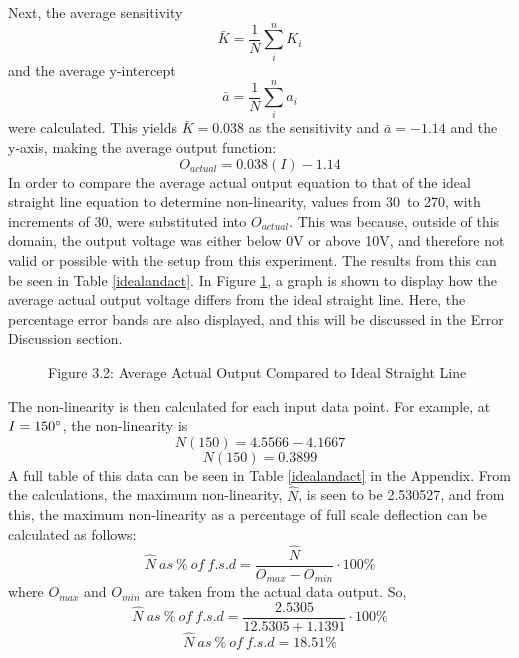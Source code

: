 \documentclass[a4,11pt]{article}
\begin{document}
Next, the average sensitivity
$$\bar{K}= \frac{1}{N}\sum_{i}^{n}{K_i}$$
and the average y-intercept
$$\bar{a}= \frac{1}{N}\sum_{i}^{n}{a_i}$$
were calculated. This yields $\bar{K}=0.038$ as the sensitivity and $\bar{a}=-1.14$ and the y-axis, making the average output function:
$$O_{actual}=0.038(I)-1.14$$
In order to compare the average actual output equation to that of the ideal straight line equation to determine non-linearity, values from 30\degree\ to 270\degree, with increments of 30\degree, were substituted into $O_{actual}$. This was because, outside of this domain, the output voltage was either below 0V or above 10V, and therefore not valid or possible with the setup from this experiment. The results from this can be seen in Table \ref{idealandact}. In Figure \ref{fig:actual}, a graph is shown to display how the average actual output voltage differs from the ideal straight line. Here, the percentage error bands are also displayed, and this will be discussed in the Error Discussion section.	

\begin{figure}[h]
	\centering
	\label{fig:actual}
	Figure 3.2: Average Actual Output Compared to Ideal Straight Line
\end{figure}

The non-linearity is then calculated for each input data point. For example, at $I=150\degree$, the non-linearity is
$$N(150)=4.5566-4.1667$$
$$N(150)=0.3899$$
A full table of this data can be seen in Table \ref{idealandact} in the Appendix. From the calculations, the maximum non-linearity, $\hat{N}$, is seen to be 2.530527, and from this, the maximum non-linearity as a percentage of full scale deflection can be calculated as follows:
$$\hat{N}\ as\ \%\ of\ f.s.d=\frac{\hat{N}}{O_{max}-O_{min}}\cdot 100\%$$
where $O_{max}$ and $O_{min}$ are taken from the actual data output. So,
$$\hat{N}\ as\ \%\ of\ f.s.d=\frac{2.5305}{12.5305+1.1391}\cdot 100\%$$
$$\hat{N}\ as\ \%\ of\ f.s.d=18.51\%$$
\end{document}
